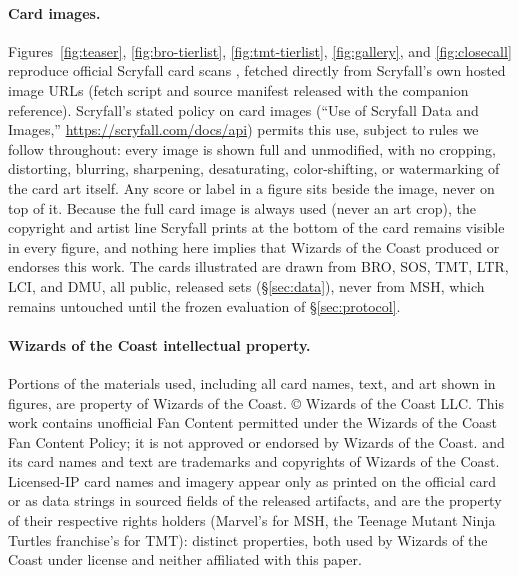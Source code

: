 \paragraph{Card images.}
Figures~\ref{fig:teaser}, \ref{fig:bro-tierlist}, \ref{fig:tmt-tierlist},
\ref{fig:gallery}, and \ref{fig:closecall} reproduce official Scryfall
card scans \citep{scryfall}, fetched directly from Scryfall's own hosted
image URLs (fetch script and source manifest released with the
companion reference). Scryfall's stated policy on card images (``Use of
Scryfall Data and Images,'' \url{https://scryfall.com/docs/api}) permits
this use, subject to rules we follow throughout: every image is shown
full and unmodified, with no cropping, distorting, blurring, sharpening,
desaturating, color-shifting, or watermarking of the card art itself.
Any score or label in a figure sits beside the image, never on top of
it. Because the full card image is always used (never an art crop), the
copyright and artist line Scryfall prints at the bottom of the card
remains visible in every figure, and nothing here implies that Wizards
of the Coast produced or endorses this work. The cards illustrated are drawn from BRO, SOS, TMT, LTR, LCI, and DMU, all
public, released sets (\S\ref{sec:data}), never from MSH, which remains
untouched until the frozen evaluation of \S\ref{sec:protocol}.

\paragraph{Wizards of the Coast intellectual property.}
Portions of the materials used, including all card names, text, and art
shown in figures, are property of Wizards of the Coast. \copyright{}
Wizards of the Coast LLC. This work contains unofficial Fan Content
permitted under the Wizards of the Coast Fan Content Policy; it is not
approved or endorsed by Wizards of the Coast. \mtg{} and its card names
and text are trademarks and copyrights of Wizards of the Coast.
Licensed-IP card names and imagery appear only as printed on the official
card or as data strings in sourced fields of the released artifacts, and
are the property of their respective rights holders (Marvel's for MSH,
the Teenage Mutant Ninja Turtles franchise's for TMT): distinct
properties, both used by Wizards of the Coast under license and neither
affiliated with this paper.
